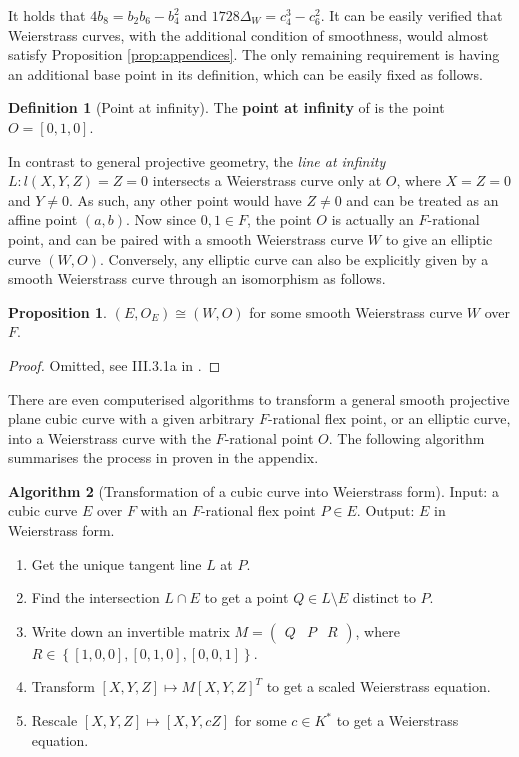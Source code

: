 \documentclass{article}
\newcommand{\rb}[1]{\left( #1 \right)}
\renewcommand{\sb}[1]{\left[ #1 \right]}
\newcommand{\cb}[1]{\left\{ #1 \right\}}
\theoremstyle{definition}\newtheorem*{definition}{Definition}
\theoremstyle{definition}\newtheorem*{example}{Example}
\theoremstyle{definition}\newtheorem*{remark}{Remark}
\newtheorem{proposition}{Proposition}[subsection]
\newtheorem{algorithm}[proposition]{Algorithm}
\begin{document}
It holds that $ 4b_8 = b_2b_6 - b_4^2 $ and $ 1728\Delta_W = c_4^3 - c_6^2 $. It can be easily verified that Weierstrass curves, with the additional condition of smoothness, would almost satisfy Proposition \ref{prop:appendices}. The only remaining requirement is having an additional base point in its definition, which can be easily fixed as follows.

\begin{definition}[Point at infinity]
The \textbf{point at infinity} of is the point $ O = \sb{0, 1, 0} $.
\end{definition}

In contrast to general projective geometry, the \emph{line at infinity} $ L : l\rb{X, Y, Z} = Z = 0 $ intersects a Weierstrass curve only at $ O $, where $ X = Z = 0 $ and $ Y \ne 0 $. As such, any other point would have $ Z \ne 0 $ and can be treated as an affine point $ \rb{a, b} $. Now since $ 0, 1 \in F $, the point $ O $ is actually an $ F $-rational point, and can be paired with a smooth Weierstrass curve $ W $ to give an elliptic curve $ \rb{W, O} $. Conversely, any elliptic curve can also be explicitly given by a smooth Weierstrass curve through an isomorphism as follows.

\begin{proposition}
$ \rb{E, O_E} \cong \rb{W, O} $ for some smooth Weierstrass curve $ W $ over $ F $.
\end{proposition}

\begin{proof}
Omitted, see III.3.1a in \cite{gtm}.
\end{proof}

There are even computerised algorithms to transform a general smooth projective plane cubic curve with a given arbitrary $ F $-rational flex point, or an elliptic curve, into a Weierstrass curve with the $ F $-rational point $ O $. The following algorithm summarises the process in \cite{weierstrass} proven in the appendix.

\begin{algorithm}[Transformation of a cubic curve into Weierstrass form]
Input: a cubic curve $ E $ over $ F $ with an $ F $-rational flex point $ P \in E $. Output: $ E $ in Weierstrass form.
\begin{enumerate}
\item Get the unique tangent line $ L $ at $ P $.
\item Find the intersection $ L \cap E $ to get a point $ Q \in L \setminus E $ distinct to $ P $.
\item Write down an invertible matrix $ M = \begin{pmatrix} Q & P & R \end{pmatrix} $, where $ R \in \cb{\sb{1, 0, 0}, \sb{0, 1, 0}, \sb{0, 0, 1}} $.
\item Transform $ \sb{X, Y, Z} \mapsto M\sb{X, Y, Z}^T $ to get a scaled Weierstrass equation.
\item Rescale $ \sb{X, Y, Z} \mapsto \sb{X, Y, cZ} $ for some $ c \in K^* $ to get a Weierstrass equation.
\end{enumerate}
\end{algorithm}
\end{document}
